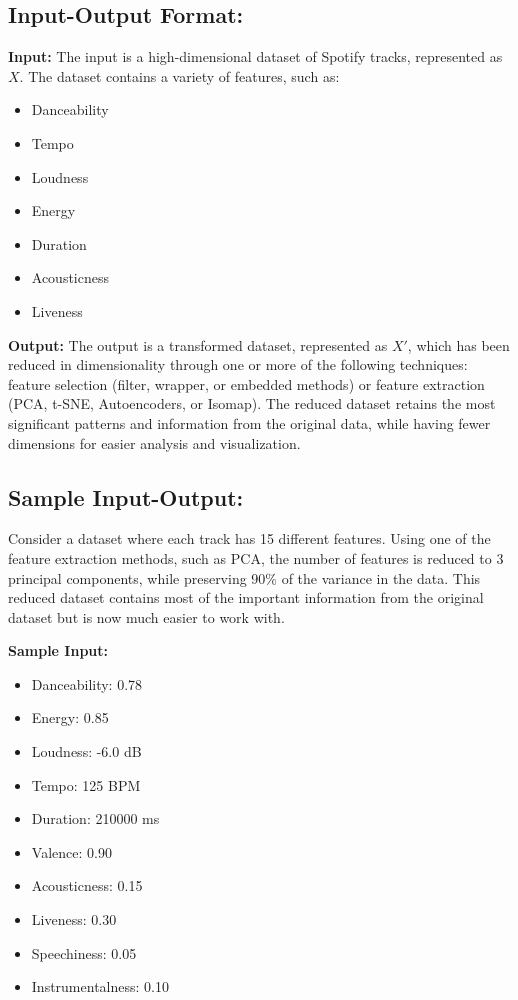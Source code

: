 \documentclass{article}
\begin{document}
\subsection{Input-Output Format:}
\textbf{Input:} The input is a high-dimensional dataset of Spotify tracks, represented as $X$. The dataset contains a variety of features, such as:
\begin{itemize}
    \item Danceability
    \item Tempo
    \item Loudness
    \item Energy
    \item Duration
    \item Acousticness
    \item Liveness
\end{itemize}

\textbf{Output:} The output is a transformed dataset, represented as $X'$, which has been reduced in dimensionality through one or more of the following techniques: feature selection (filter, wrapper, or embedded methods) or feature extraction (PCA, t-SNE, Autoencoders, or Isomap). The reduced dataset retains the most significant patterns and information from the original data, while having fewer dimensions for easier analysis and visualization.

\subsection{Sample Input-Output:}
Consider a dataset where each track has 15 different features. Using one of the feature extraction methods, such as PCA, the number of features is reduced to 3 principal components, while preserving 90\% of the variance in the data. This reduced dataset contains most of the important information from the original dataset but is now much easier to work with.

\textbf{Sample Input:}
\begin{itemize}
    \item Danceability: 0.78
    \item Energy: 0.85
    \item Loudness: -6.0 dB
    \item Tempo: 125 BPM
    \item Duration: 210000 ms
    \item Valence: 0.90
    \item Acousticness: 0.15
    \item Liveness: 0.30
    \item Speechiness: 0.05
    \item Instrumentalness: 0.10
\end{itemize}
\end{document}
